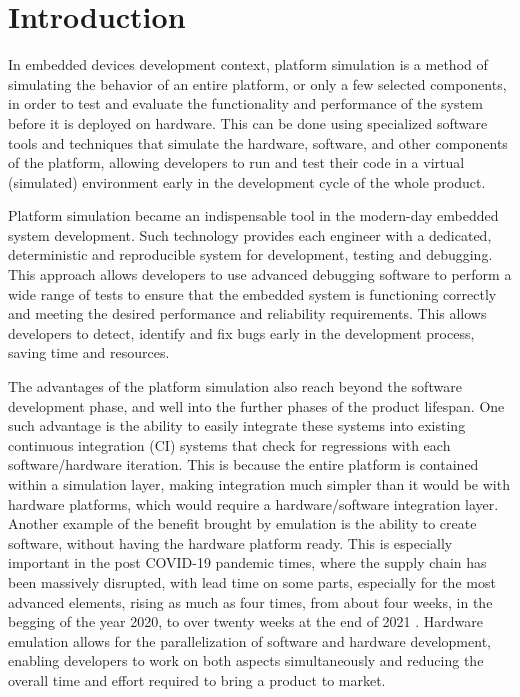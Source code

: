 
\chapter{Introduction}

In embedded devices development context, platform simulation is a method of simulating 
the behavior of an entire platform, or only a few selected components, in order to test and evaluate
the functionality and performance of the system before it is deployed on hardware. This can be done using specialized
software tools and techniques that simulate the hardware, software, and other components of the platform,
allowing developers to run and test their code in a virtual (simulated) environment early in the development cycle of the whole product.

Platform simulation became an indispensable tool in the modern-day embedded system development. Such technology
provides each engineer with a dedicated, deterministic and reproducible system for development, testing and debugging.
This approach allows developers to use advanced debugging software to perform a wide range of tests to ensure that
the embedded system is functioning correctly and meeting the desired performance and reliability requirements. 
This allows developers to detect, identify and fix bugs early in the development process, saving time and resources.

The advantages of the platform simulation also reach beyond the software development phase, and well into the further
phases of the product lifespan. One such advantage is the ability to easily integrate these systems into existing
continuous integration (CI) systems that check for regressions with each software/hardware iteration.
This is because the entire platform is contained within a simulation layer, making integration much simpler than it
would be with hardware platforms, which would require a hardware/software integration layer. Another example of
the benefit brought by emulation is 
the ability to create software, without having the hardware platform ready.
This is especially important in the post COVID-19 pandemic times, where the 
supply chain has been massively
disrupted, with lead time on some parts, especially for the most advanced elements, rising as much as four times,
from about four weeks, in the begging of the year 2020, to over twenty weeks at the end of 2021
\cite{Covid19-AUTOMOTIVE} \cite{Covid19-LEAD-TIME} \cite{Covid19-LEAD-TIME-BLOOMBERG}. Hardware emulation allows for
the parallelization of software and hardware development, enabling developers to work on both aspects
simultaneously and reducing the overall time and effort required to bring a product to market.

